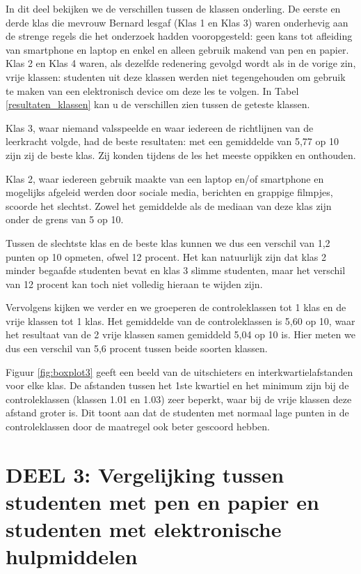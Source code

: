 In dit deel bekijken we de verschillen tussen de klassen onderling. De eerste en derde klas die mevrouw Bernard lesgaf (Klas 1 en Klas 3) waren onderhevig aan de strenge regels die het onderzoek hadden vooropgesteld: geen kans tot afleiding van smartphone en laptop en enkel en alleen gebruik makend van pen en papier. Klas 2 en Klas 4 waren, als dezelfde redenering gevolgd wordt als in de vorige zin, vrije klassen: studenten uit deze klassen werden niet tegengehouden om gebruik te maken van een elektronisch device om deze les te volgen. In Tabel \ref{resultaten_klassen} kan u de verschillen zien tussen de geteste klassen.

Klas 3, waar niemand valsspeelde en waar iedereen de richtlijnen van de leerkracht volgde, had de beste resultaten: met een gemiddelde van 5,77 op 10 zijn zij de beste klas. Zij konden tijdens de les het meeste oppikken en onthouden.

Klas 2, waar iedereen gebruik maakte van een laptop en/of smartphone en mogelijks afgeleid werden door sociale media, berichten en grappige filmpjes, scoorde het slechtst. Zowel het gemiddelde als de mediaan van deze klas zijn onder de grens van 5 op 10.

Tussen de slechtste klas en de beste klas kunnen we dus een verschil van 1,2 punten op 10 opmeten, ofwel 12 procent. Het kan natuurlijk zijn dat klas 2 minder begaafde studenten bevat en klas 3 slimme studenten, maar het verschil van 12 procent kan toch niet volledig hieraan te wijden zijn.

Vervolgens kijken we verder en we groeperen de controleklassen tot 1 klas en de vrije klassen tot 1 klas. Het gemiddelde van de controleklassen is 5,60 op 10, waar het resultaat van de 2 vrije klassen samen gemiddeld 5,04 op 10 is. Hier meten we dus een verschil van 5,6 procent tussen beide soorten klassen.

Figuur \ref{fig:boxplot3} geeft een beeld van de uitschieters en interkwartielafstanden voor elke klas. De afstanden tussen het 1ste kwartiel en het minimum zijn bij de controleklassen (klassen 1.01 en 1.03) zeer beperkt, waar bij de vrije klassen deze afstand groter is. Dit toont aan dat de studenten met normaal lage punten in de controleklassen door de maatregel ook beter gescoord hebben. 


\section{DEEL 3: Vergelijking tussen studenten met pen en papier en studenten met elektronische hulpmiddelen}
\label{sec:vragen_res3}

